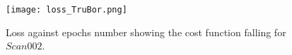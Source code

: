 \appendix

\makeatletter
\renewcommand{\@makechapterhead}[1]{\vspace *{-10\p@ }{\parindent \z@ 
\raggedright \normalfont \ifnum \c@secnumdepth >\m@ne \Huge \bfseries 
\@chapapp \space \thechapter \vskip 10\p@ \fi #1\par \nobreak \vskip 30\p@ }}
\makeatother


\chapter{}
\begin{figure}[hb!]
\begin{center}
\texttt{[image: loss\_TruBor.png]}
\end{center}
\caption[Loss function graph]{Loss against epochs number showing the cost function falling for $Scan002$.}
\end{figure}

